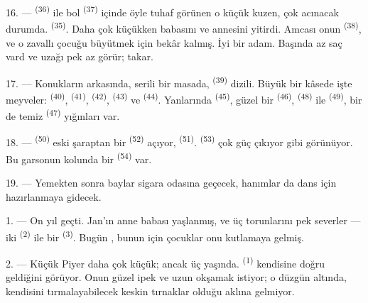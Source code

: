16. ---  \textsuperscript{(36)} ile bol 
\textsuperscript{(37)} içinde öyle tuhaf görünen o küçük kuzen, çok acınacak
durumda.  \textsuperscript{(35)}. Daha çok küçükken babasını
ve annesini yitirdi. Amcası onun  \textsuperscript{(38)}, ve
o zavallı çocuğu büyütmek için bekâr kalmış. İyi bir adam. Başında az saç
vard ve uzağı pek az görür;  takar.

\VUsaut{2.4mm}
\VUsaut{3.0mm}

17. --- Konukların arkasında,  serili bir masada, 
\textsuperscript{(39)} dizili. Büyük bir kâsede işte meyveler:
 \textsuperscript{(40)},  \textsuperscript{(41)},
 \textsuperscript{(42)},  \textsuperscript{(43)} ve
 \textsuperscript{(44)}. Yanlarında 
\textsuperscript{(45)}, güzel bir  \textsuperscript{(46)},
 \textsuperscript{(48)} ile 
\textsuperscript{(49)}, bir de temiz  \textsuperscript{(47)}
yığınları var.

18. ---  \textsuperscript{(50)} eski şaraptan bir
 \textsuperscript{(52)} açıyor, 
\textsuperscript{(51)}.  \textsuperscript{(53)} çok güç
çıkıyor gibi görünüyor. Bu garsonun kolunda bir 
\textsuperscript{(54)} var.

19. --- Yemekten sonra baylar sigara odasına geçecek, hanımlar da dans için
hazırlanmaya gidecek.

\VUsaut{5.0mm}
\VUsaut{1.6mm}
\VUsaut{2.6mm}

\VUsaut{3.0mm}

1. --- On yıl geçti. Jan'ın anne babası yaşlanmış, ve üç torunlarını pek
severler — iki  \textsuperscript{(2)} ile bir
 \textsuperscript{(3)}. Bugün , bunun için çocuklar onu kutlamaya gelmiş.

2. --- Küçük Piyer daha çok küçük; ancak üç yaşında. 
\textsuperscript{(1)} kendisine doğru geldiğini görüyor. Onun güzel ipek
 ve uzun  okşamak istiyor; o düzgün
 altında, kendisini tırmalayabilecek keskin tırnaklar
olduğu aklına gelmiyor.

